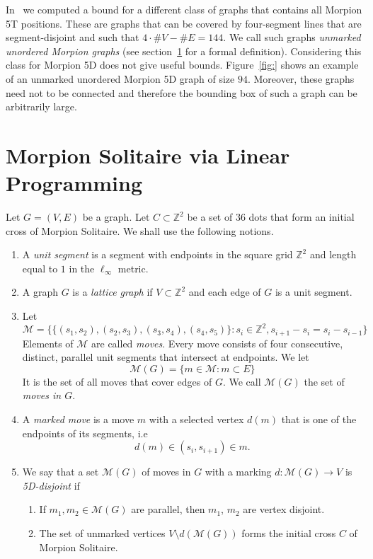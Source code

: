 \documentclass[a4paper,UKenglish]{lipics}
\begin{document}
In~\cite{} we computed a bound for a different class of graphs that contains all Morpion 5T positions.
These are graphs that can be covered by four-segment lines that are segment-disjoint and such that $4\cdot \# V - \# E = 144$.
We call such graphs \emph{unmarked unordered Morpion graphs} (see section~\ref{sec:linear} for a formal definition).
Considering this class for Morpion 5D  does not give useful bounds. 
Figure~\ref{fig:} shows an example of an unmarked unordered Morpion 5D graph of size $94$.
Moreover, these graphs need not to be connected and therefore the bounding box of such a graph
  can be arbitrarily large.
  
\section{Morpion Solitaire via Linear Programming}
\label{sec:linear}

\begin{definition}
  Let $G = (V, E)$ be a graph. 
  Let $C \subset \mathbb{Z}^2$ be a set of $36$ dots that form an initial cross of Morpion Solitaire.
  We shall use the following notions.
  \begin{enumerate}
    \item A \emph{unit segment} is a segment with endpoints in the square grid $\mathbb{Z}^2$ and length 
    	equal to $1$ in the $\ell_\infty$ metric.
    \item A graph $G$ is a \emph{lattice graph} if $V \subset \mathbb{Z}^2$
      and each edge of $G$ is a unit segment.
    \item Let 
    \[
      \mathcal{M} = \{ \{ (s_1, s_2), (s_2, s_3), (s_3, s_4), (s_4, s_5) \} \colon s_i \in \mathbb{Z}^2, s_{i+1} - s_i = s_i - s_{i-1} \}
    \]
    Elements of $\mathcal{M}$ are called \emph{moves}. 
    Every move consists of four consecutive, distinct, parallel unit segments that intersect at endpoints.
    We let
    \[
      \mathcal{M}(G) = \{ m \in \mathcal{M} \colon m \subset E \}
    \]
    It is the set of all moves that cover edges of $G$. We call $\mathcal{M}(G)$ the set of \emph{moves in $G$}.
    \item A \emph{marked move} is a move $m$ with a selected vertex $d(m)$ that is one of the endpoints
      of its segments, i.e
      \[
      	d(m) \in (s_i, s_{i+1}) \in m.
      \]
    \item We say that a set $\mathcal{M}(G)$ of moves in $G$ with a marking $d \colon \mathcal{M}(G) \to V$ is \emph{5D-disjoint} if
      \begin{enumerate}
        \item If $m_1, m_2 \in \mathcal{M}(G)$ are parallel, then $m_1$, $m_2$ are vertex disjoint.
        \item The set of unmarked vertices $V \setminus d(\mathcal{M}(G))$ forms the initial cross $C$ of Morpion Solitaire.
      \end{enumerate}
  \end{enumerate}
\end{definition}
\end{document}
